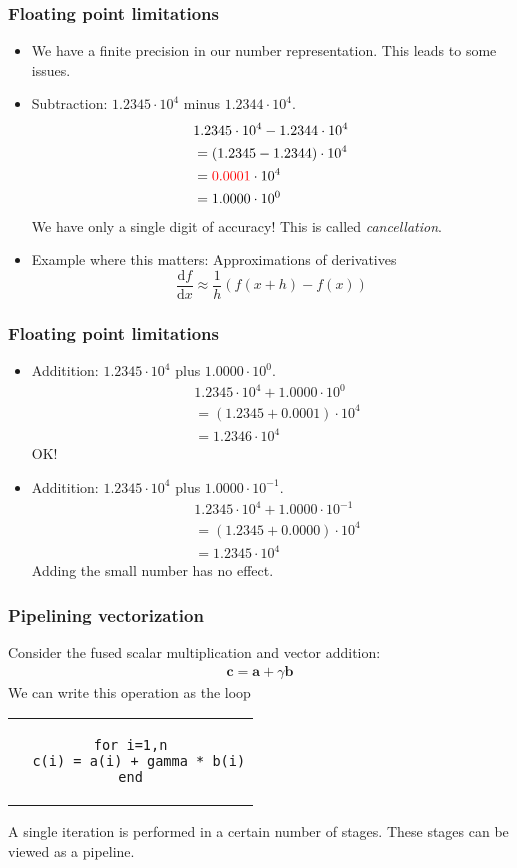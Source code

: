 \begin{frame}
  \frametitle{Floating point limitations}
  \begin{itemize}
  \item We have a finite precision in our number representation. This leads to
    some issues.
  \item Subtraction: $1.2345\cdot 10^4$ minus $1.2344\cdot 10^4$.
    \begin{align*}
      & 1.2345 \cdot 10^4 - 1.2344 \cdot 10^4 \\
      &= (1.2345 - 1.2344) \cdot 10^4 \\
      &= \textcolor{red}{0.0001} \cdot 10^4 \\
      &= 1.0000 \cdot 10^0
    \end{align*}
    We have only a single digit of accuracy! This is called \emph{cancellation}.
  \item Example where this matters: Approximations of derivatives
    \[
      \frac{\text{d}f}{\text{d}x} \approx \frac{1}{h}\left( f(x+h) - f(x) \right)
    \]
  \end{itemize}
\end{frame}

\begin{frame}
  \frametitle{Floating point limitations}
  \begin{itemize}
  \item Additition: $1.2345\cdot 10^4$ plus $1.0000\cdot 10^0$.
    \begin{align*}
      & 1.2345 \cdot 10^4 + 1.0000 \cdot 10^0 \\
      &= (1.2345 + 0.0001) \cdot 10^4 \\
      &= 1.2346 \cdot 10^4
    \end{align*}
    OK!
  \item Additition: $1.2345\cdot 10^4$ plus $1.0000\cdot 10^{-1}$.
    \begin{align*}
      & 1.2345 \cdot 10^4 + 1.0000 \cdot 10^{-1} \\
      &= (1.2345 + 0.0000) \cdot 10^4 \\
      &= 1.2345 \cdot 10^4
    \end{align*}
    Adding the small number has no effect.
  \end{itemize}
\end{frame}

\begin{frame}[fragile]
  \frametitle{Pipelining vectorization}
  Consider the fused scalar multiplication and vector addition:
  \begin{align*}
    \bm c = \bm a + \gamma \bm b
  \end{align*}
  We can write this operation as the loop
  \begin{center}
    \begin{tabular}{c}
\begin{lstlisting}[style=fortran]
for i=1,n
  c(i) = a(i) + gamma * b(i)
end
\end{lstlisting}
    \end{tabular}
  \end{center}
  A single iteration is performed in a certain number of stages. These stages
  can be viewed as a pipeline.
\end{frame}

